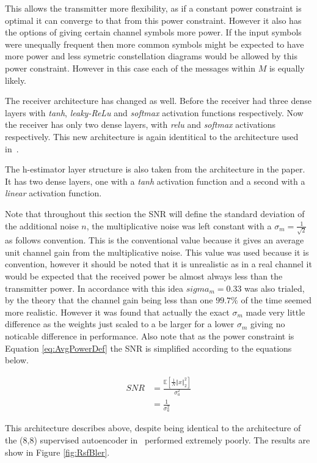 \documentclass[12pt,onecolumn,letterpaper]{article}
\newcommand{\code}{\textit}
\begin{document}
This allows the transmitter more flexibility, as if a constant power constraint is optimal it can converge to that from this power constraint. However it also has the options of giving certain channel symbols more power. If the input symbols were unequally frequent then more common symbols might be expected to have more power and less symetric constellation diagrams would be allowed by this power constraint. However in this case each of the messages within $M$ is equally likely. 

The receiver architecture has changed as well. Before the receiver had three dense layers with \code{tanh}, \code{leaky-ReLu} and \code{softmax} activation functions respectively. Now the receiver has only two dense layers, with \code{relu} and \code{softmax} activations respectively. This new architecture is again identitical to the architecture used in~\cite{Aoudia}.

The h-estimator layer structure is also taken from the architecture in the paper. It has two dense layers, one with a \code{tanh} activation function and a second with a \code{linear} activation function. 

Note that throughout this section the SNR will define the standard deviation of the additional noise $n$, the multiplicative noise was left constant with a $\sigma_m = \frac{1}{\sqrt{2}}$ as follows convention. This is the conventional value because it gives an average unit channel gain from the multiplicative noise. This value was used because it is convention, however it should be noted that it is unrealistic as in a real channel it would be expected that the received power be almost always less than the transmitter power. In accordance with this idea $sigma_m = 0.33$ was also trialed, by the theory that the channel gain being less than one $99.7\%$ of the time seemed more realistic. However it was found that actually the exact $\sigma_m$ made very little difference as the weights just scaled to a be larger for a lower $\sigma_m$ giving no noticable difference in performance. Also note that as the power constraint is Equation \ref{eq:AvgPowerDef} the SNR is simplified according to the equations below.

\begin{align}
   SNR &= \frac{\mathbb{E}\left[\frac{1}{N}\left\Vert x\right\Vert_2^2\right]}{\sigma_a^2} \nonumber\\
   &= \frac{1}{\sigma_a^2}
   \label{eq:AoudiaSnrDef}
\end{align}

This architecture describes above, despite being identical to the architecture of the (8,8) supervised autoencoder in~\cite{Aoudia} performed extremely poorly. The results are show in Figure \ref{fig:RsfBler}.
\end{document}

